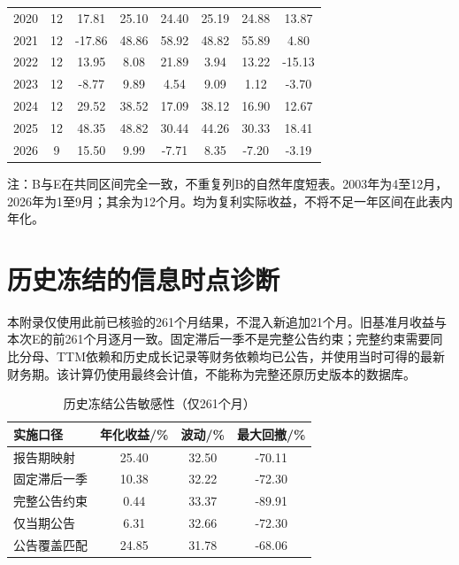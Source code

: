 \begin{table}[htbp]
\begin{tabularx}{\textwidth}{@{}p{1.05cm}*{7}{C}@{}}
2020 & 12 & 17.81 & 25.10 & 24.40 & 25.19 & 24.88 & 13.87 \\
2021 & 12 & -17.86 & 48.86 & 58.92 & 48.82 & 55.89 & 4.80 \\
2022 & 12 & 13.95 & 8.08 & 21.89 & 3.94 & 13.22 & -15.13 \\
2023 & 12 & -8.77 & 9.89 & 4.54 & 9.09 & 1.12 & -3.70 \\
2024 & 12 & 29.52 & 38.52 & 17.09 & 38.12 & 16.90 & 12.67 \\
2025 & 12 & 48.35 & 48.82 & 30.44 & 44.26 & 30.33 & 18.41 \\
2026 & 9 & 15.50 & 9.99 & -7.71 & 8.35 & -7.20 & -3.19 \\
\bottomrule
\end{tabularx}
\par\smallskip
\begin{minipage}{\textwidth}\small 注：B与E在共同区间完全一致，不重复列B的自然年度短表。2003年为4至12月，2026年为1至9月；其余为12个月。均为复利实际收益，不将不足一年区间在此表内年化。\end{minipage}
\end{table}

\setcounter{table}{0}
\renewcommand{\thetable}{B\arabic{table}}
\chapter{历史冻结的信息时点诊断}
本附录仅使用此前已核验的261个月结果，不混入新追加21个月。旧基准月收益与本次E的前261个月逐月一致。固定滞后一季不是完整公告约束；完整约束需要同比分母、TTM依赖和历史成长记录等财务依赖均已公告，并使用当时可得的最新财务期。该计算仍使用最终会计值，不能称为完整还原历史版本的数据库。

\begin{table}[htbp]
\centering
\caption{历史冻结公告敏感性（仅261个月）}
\renewcommand{\arraystretch}{1.18}
\small
\setlength{\tabcolsep}{4.5pt}
\begin{tabularx}{\textwidth}{@{}p{3.15cm}*{3}{C}@{}}
\toprule
实施口径 & 年化收益/\% & 波动/\% & 最大回撤/\% \\
\midrule
报告期映射 & 25.40 & 32.50 & -70.11 \\
固定滞后一季 & 10.38 & 32.22 & -72.30 \\
完整公告约束 & 0.44 & 33.37 & -89.91 \\
仅当期公告 & 6.31 & 32.66 & -72.30 \\
公告覆盖匹配 & 24.85 & 31.78 & -68.06 \\
\bottomrule
\end{tabularx}
\end{table}

